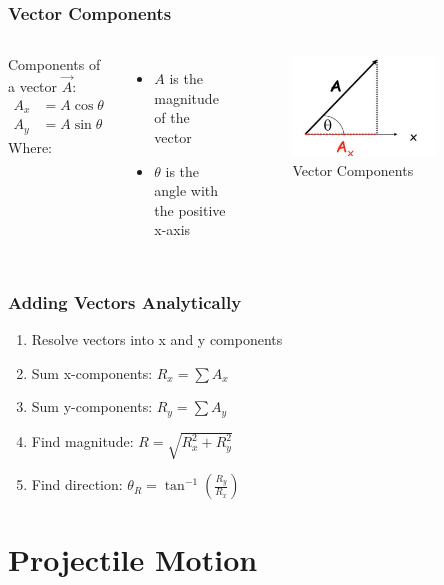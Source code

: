 \documentclass{beamer}
\begin{document}
\begin{frame}
\frametitle{Vector Components}
\begin{columns}
Components of a vector $\vec{A}$:
\begin{align*}
A_x &= A \cos \theta \\
A_y &= A \sin \theta
\end{align*}
Where:
\begin{itemize}
\item $A$ is the magnitude of the vector
\item $\theta$ is the angle with the positive x-axis
\end{itemize}

\begin{figure}
\centering
\includegraphics[width=0.8\textwidth]{phys12-vectors-vector-components.png}
\caption{Vector Components}
\end{figure}
\end{columns}
\end{frame}

\begin{frame}
\frametitle{Adding Vectors Analytically}
\begin{enumerate}[<+->]
\item Resolve vectors into x and y components
\item Sum x-components: $R_x = \sum A_x$
\item Sum y-components: $R_y = \sum A_y$
\item Find magnitude: $R = \sqrt{R_x^2 + R_y^2}$
\item Find direction: $\theta_R = \tan^{-1} \left( \frac{R_y}{R_x} \right)$
\end{enumerate}
\end{frame}

\section{Projectile Motion}
\end{document}
